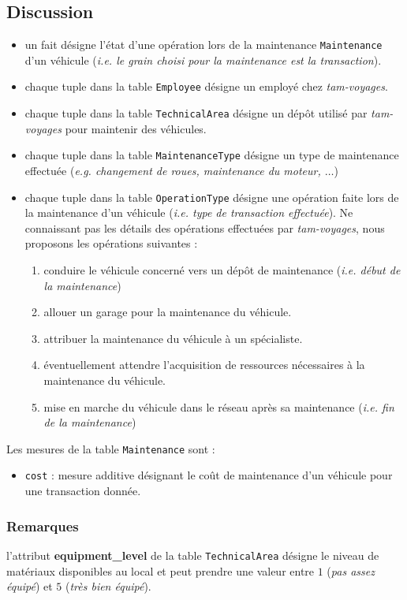 \documentclass[a4paper,12pt]{report}
\begin{document}
\subsection{Discussion}
\begin{itemize}
  \item un fait désigne l'état d'une opération lors de la maintenance \texttt{Maintenance} d'un véhicule (\textit{i.e. le grain choisi pour la maintenance est la transaction}).
  \item chaque tuple dans la table \texttt{Employee} désigne un employé chez \textit{tam-voyages}.
  \item chaque tuple dans la table \texttt{TechnicalArea} désigne un dépôt utilisé par \textit{tam-voyages} pour maintenir des véhicules.
  \item chaque tuple dans la table \texttt{MaintenanceType} désigne un type de maintenance effectuée (\textit{e.g. changement de roues, maintenance du moteur, $\dots$})
  \item chaque tuple dans la table \texttt{OperationType} désigne une opération faite lors de la maintenance d'un véhicule (\textit{i.e. type de transaction effectuée}). Ne connaissant pas les détails des opérations effectuées par \textit{tam-voyages}, nous proposons les opérations suivantes :
  \begin{enumerate}
    \item conduire le véhicule concerné vers un dépôt de maintenance (\textit{i.e. début de la maintenance})
    \item allouer un garage pour la maintenance du véhicule.
    \item attribuer la maintenance du véhicule à un spécialiste.
    \item éventuellement attendre l'acquisition de ressources nécessaires à la maintenance du véhicule.
    \item mise en marche du véhicule dans le réseau après sa maintenance (\textit{i.e. fin de la maintenance})
  \end{enumerate}
\end{itemize}

Les mesures de la table \texttt{Maintenance} sont :
\begin{itemize}
  \item \texttt{cost} : mesure additive désignant le coût de maintenance d'un véhicule pour une transaction donnée.
\end{itemize}

\subsubsection{Remarques}
l'attribut \textbf{equipment\_level} de la table \texttt{TechnicalArea} désigne le niveau de matériaux disponibles au local et peut prendre une valeur entre $1$ (\textit{pas assez équipé}) et $5$ (\textit{très bien équipé}).
\end{document}
